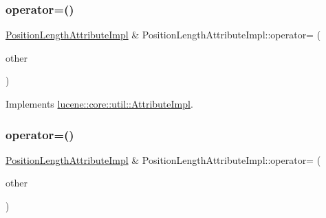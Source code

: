 \subsubsection{\texorpdfstring{operator=()}{operator=()}\hspace{0.1cm}{\footnotesize\ttfamily [1/2]}}
{\footnotesize\ttfamily \mbox{\hyperlink{classlucene_1_1core_1_1analysis_1_1tokenattributes_1_1PositionLengthAttributeImpl}{Position\+Length\+Attribute\+Impl}} \& Position\+Length\+Attribute\+Impl\+::operator= (\begin{DoxyParamCaption}\item[{const \mbox{\hyperlink{classlucene_1_1core_1_1util_1_1AttributeImpl}{lucene\+::core\+::util\+::\+Attribute\+Impl}} \&}]{other }\end{DoxyParamCaption})\hspace{0.3cm}{\ttfamily [virtual]}}



Implements \mbox{\hyperlink{classlucene_1_1core_1_1util_1_1AttributeImpl_ab032e399d03ce2f58c76881cf2b92325}{lucene\+::core\+::util\+::\+Attribute\+Impl}}.

\mbox{\label{classlucene_1_1core_1_1analysis_1_1tokenattributes_1_1PositionLengthAttributeImpl_a01cf482ffe511eaa7de8b8c19690f4d7}} 
\subsubsection{\texorpdfstring{operator=()}{operator=()}\hspace{0.1cm}{\footnotesize\ttfamily [2/2]}}
{\footnotesize\ttfamily \mbox{\hyperlink{classlucene_1_1core_1_1analysis_1_1tokenattributes_1_1PositionLengthAttributeImpl}{Position\+Length\+Attribute\+Impl}} \& Position\+Length\+Attribute\+Impl\+::operator= (\begin{DoxyParamCaption}\item[{const \mbox{\hyperlink{classlucene_1_1core_1_1analysis_1_1tokenattributes_1_1PositionLengthAttributeImpl}{Position\+Length\+Attribute\+Impl}} \&}]{other }\end{DoxyParamCaption})}

